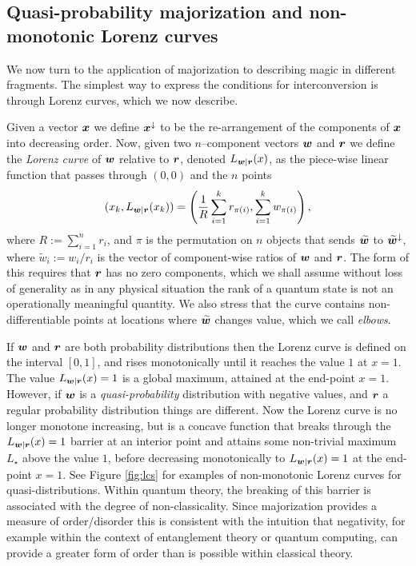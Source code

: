 \documentclass[pra,
aps,
twocolumn,
superscriptaddress,
groupedaddress,
nofootinbib,
reprint
]{revtex4-1}
\begin{document}
\subsection{Quasi-probability majorization and non-monotonic Lorenz curves}

We now turn to the application of majorization to describing magic in different fragments. The simplest way to express the conditions for interconversion is through Lorenz curves, which we now describe.

Given a vector $\boldsymbol{x}$ we define $\boldsymbol{x}^\downarrow$ to be the re-arrangement of the components of $\boldsymbol{x}$ into decreasing order. Now, given two $n$--component vectors $\boldsymbol{w}$ and $\boldsymbol{r}$ we define the \emph{Lorenz curve} of $\boldsymbol{w}$ relative to $\boldsymbol{r}$, denoted $L_{\boldsymbol{w}|\boldsymbol{r}}(x)$, as the piece-wise linear function that passes through $(0,0)$ and the $n$ points
\begin{equation}\label{eq:lorenz}
        (x_k,L_{\boldsymbol{w}|\boldsymbol{r}}(x_k)) =\left( \frac{1}{R}\sum_{i=1}^k r_{\pi(i)}, \sum_{i=1}^k w_{\pi(i)} \right),
\end{equation}
where $R:= \sum_{i=1}^n r_i$, and $\pi$ is the permutation on $n$ objects that sends $\widetilde{\boldsymbol{w}}$ to $\widetilde{\boldsymbol{w}}^{\downarrow}$, where $\widetilde{w}_i := w_i/r_i$ is the vector of component-wise ratios of $\boldsymbol{w}$ and $\boldsymbol{r}$. The form of this requires that $\boldsymbol{r}$ has no zero components, which we shall assume without loss of generality as in any physical situation the rank of a quantum state is not an operationally meaningful quantity.
We also stress that the curve contains non-differentiable points at locations where $\widetilde{\bm{w}}$ changes value, which we call \emph{elbows}.

If $\boldsymbol{w}$ and $\boldsymbol{r}$ are both probability distributions then the Lorenz curve is defined on the interval $[0,1]$, and rises monotonically until it reaches the value $1$ at $x=1$. The value $L_{\boldsymbol{w}|\boldsymbol{r}}(x) = 1$ is a global maximum, attained at the end-point $x=1$. However, if $\boldsymbol{w}$ is a \emph{quasi-probability} distribution with negative values, and $\boldsymbol{r}$ a regular probability distribution things are different. Now the Lorenz curve is no longer monotone increasing, but is a concave function that breaks through the $L_{\boldsymbol{w}|\boldsymbol{r}}(x) = 1$ barrier at an interior point and attains some non-trivial maximum $L_\star$ above the value $1$, before decreasing monotonically to $L_{\boldsymbol{w}|\boldsymbol{r}}(x)= 1$ at the end-point $x=1$. See Figure \ref{fig:lcs} for examples of non-monotonic Lorenz curves for quasi-distributions. Within quantum theory, the breaking of this barrier is associated with the degree of non-classicality. Since majorization provides a measure of order/disorder this is consistent with the intuition that negativity, for example within the context of entanglement theory or quantum computing, can provide a greater form of order than is possible within classical theory.
\end{document}
